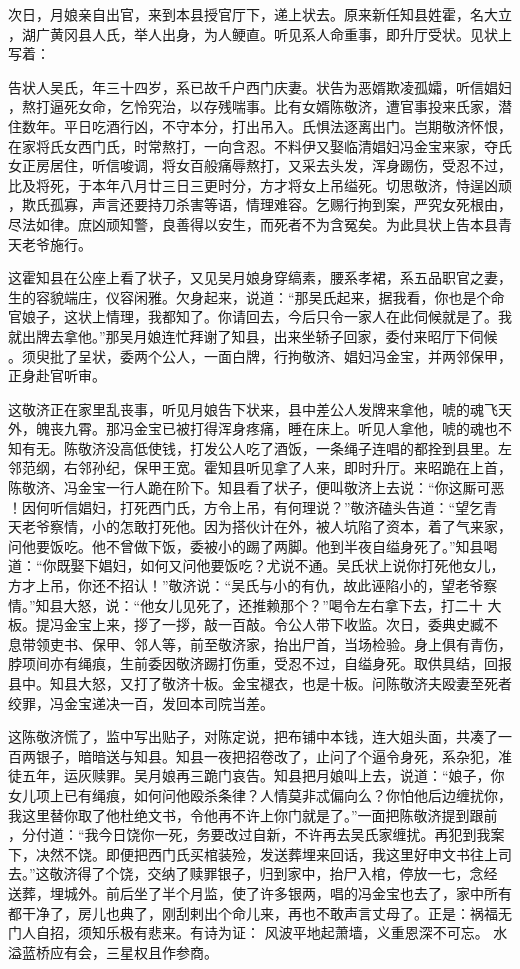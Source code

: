 次日，月娘亲自出官，来到本县授官厅下，递上状去。原来新任知县姓霍，名大立
，湖广黄冈县人氏，举人出身，为人鲠直。听见系人命重事，即升厅受状。见状上
写着：

告状人吴氏，年三十四岁，系已故千户西门庆妻。状告为恶婿欺凌孤孀，听信娼妇
，熬打逼死女命，乞怜究治，以存残喘事。比有女婿陈敬济，遭官事投来氏家，潜
住数年。平日吃酒行凶，不守本分，打出吊入。氏惧法逐离出门。岂期敬济怀恨，
在家将氏女西门氏，时常熬打，一向含忍。不料伊又娶临清娼妇冯金宝来家，夺氏
女正房居住，听信唆调，将女百般痛辱熬打，又采去头发，浑身踢伤，受忍不过，
比及将死，于本年八月廿三日三更时分，方才将女上吊缢死。切思敬济，恃逞凶顽
，欺氏孤寡，声言还要持刀杀害等语，情理难容。乞赐行拘到案，严究女死根由，
尽法如律。庶凶顽知警，良善得以安生，而死者不为含冤矣。为此具状上告本县青
天老爷施行。

这霍知县在公座上看了状子，又见吴月娘身穿缟素，腰系孝裙，系五品职官之妻，
生的容貌端庄，仪容闲雅。欠身起来，说道：“那吴氏起来，据我看，你也是个命
官娘子，这状上情理，我都知了。你请回去，今后只令一家人在此伺候就是了。我
就出牌去拿他。”那吴月娘连忙拜谢了知县，出来坐轿子回家，委付来昭厅下伺候
。须臾批了呈状，委两个公人，一面白牌，行拘敬济、娼妇冯金宝，并两邻保甲，
正身赴官听审。

这敬济正在家里乱丧事，听见月娘告下状来，县中差公人发牌来拿他，唬的魂飞天
外，魄丧九霄。那冯金宝已被打得浑身疼痛，睡在床上。听见人拿他，唬的魂也不
知有无。陈敬济没高低使钱，打发公人吃了酒饭，一条绳子连唱的都拴到县里。左
邻范纲，右邻孙纪，保甲王宽。霍知县听见拿了人来，即时升厅。来昭跪在上首，
陈敬济、冯金宝一行人跪在阶下。知县看了状子，便叫敬济上去说：“你这厮可恶
！因何听信娼妇，打死西门氏，方令上吊，有何理说？”敬济磕头告道：“望乞青
天老爷察情，小的怎敢打死他。因为搭伙计在外，被人坑陷了资本，着了气来家，
问他要饭吃。他不曾做下饭，委被小的踢了两脚。他到半夜自缢身死了。”知县喝
道：“你既娶下娼妇，如何又问他要饭吃？尤说不通。吴氏状上说你打死他女儿，
方才上吊，你还不招认！”敬济说：“吴氏与小的有仇，故此诬陷小的，望老爷察
情。”知县大怒，说：“他女儿见死了，还推赖那个？”喝令左右拿下去，打二十
大板。提冯金宝上来，拶了一拶，敲一百敲。令公人带下收监。次日，委典史臧不
息带领吏书、保甲、邻人等，前至敬济家，抬出尸首，当场检验。身上俱有青伤，
脖项间亦有绳痕，生前委因敬济踢打伤重，受忍不过，自缢身死。取供具结，回报
县中。知县大怒，又打了敬济十板。金宝褪衣，也是十板。问陈敬济夫殴妻至死者
绞罪，冯金宝递决一百，发回本司院当差。

这陈敬济慌了，监中写出贴子，对陈定说，把布铺中本钱，连大姐头面，共凑了一
百两银子，暗暗送与知县。知县一夜把招卷改了，止问了个逼令身死，系杂犯，准
徒五年，运灰赎罪。吴月娘再三跪门哀告。知县把月娘叫上去，说道：“娘子，你
女儿项上已有绳痕，如何问他殴杀条律？人情莫非忒偏向么？你怕他后边缠扰你，
我这里替你取了他杜绝文书，令他再不许上你门就是了。”一面把陈敬济提到跟前
，分付道：“我今日饶你一死，务要改过自新，不许再去吴氏家缠扰。再犯到我案
下，决然不饶。即便把西门氏买棺装殓，发送葬埋来回话，我这里好申文书往上司
去。”这敬济得了个饶，交纳了赎罪银子，归到家中，抬尸入棺，停放一七，念经
送葬，埋城外。前后坐了半个月监，使了许多银两，唱的冯金宝也去了，家中所有
都干净了，房儿也典了，刚刮剌出个命儿来，再也不敢声言丈母了。正是：祸福无
门人自招，须知乐极有悲来。有诗为证：
风波平地起萧墙，义重恩深不可忘。
水溢蓝桥应有会，三星权且作参商。